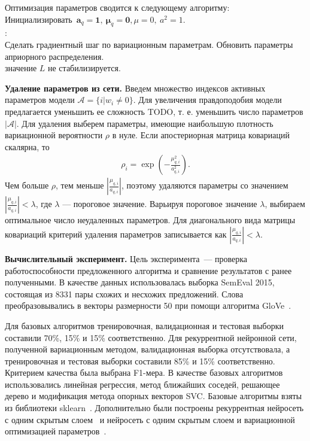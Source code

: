 Оптимизация параметров сводится к следующему алгоритму:\\
\indent \indent Инициализировать~$\mathbf{a}_q = \textbf{1}, \ \boldsymbol{\mu}_q = \textbf{0}, {\mu} = 0, \ a^2 = 1$.\\
\indent {}:\\
\indent \indent Сделать градиентный шаг по вариационным параметрам.
\indent \indent Обновить параметры априорного распределения.\\
\indent {} значение $L$ не стабилизируется.


\textbf{Удаление параметров из сети. }
Введем множество индексов активных параметров модели $\mathcal{A} = \{i | w_i \neq 0\} $. Для увеличения правдоподобия модели предлагается уменьшить ее сложность TODO, т. е. уменьшить число параметров $|\mathcal{A}|$. Для удаления выберем параметры, имеющие наибольшую плотность вариационной вероятности $\rho$ в нуле.
Если апостериорная матрица ковариаций скалярна, то  
\begin{gather}
\rho_i = \exp\left(-\frac{\mu_{q,i}^2}{a_{q,i}^2}\right).
\end{gather}
Чем больше $\rho$, тем меньше $|\frac{\mu_{q,i}}{a_{q,i}}|$, поэтому удаляются параметры со значением $|\frac{\mu_{q,i}}{a_{q,i}}| < \lambda$, где $\lambda$ --- пороговое значение. Варьируя пороговое значение $\lambda$, выбираем оптимальное число неудаленных параметров.
Для диагонального вида матрицы ковариаций критерий удаления параметров записывается как $|\frac{\mu_{q,i}}{a_{q,i}}| < \lambda$.

\textbf{Вычислительный эксперимент. }
Цель эксперимента~--- проверка работоспособности предложенного алгоритма и сравнение результатов с ранее полученными. В качестве данных использовалась выборка SemEval 2015, состоящая из 8331 пары схожих и несхожих предложений. Слова преобразовывались в векторы размерности 50 при помощи алгоритма GloVe~\cite{GloveURL}.

Для базовых алгоритмов тренировочная, валидационная и тестовая выборки составили 70\%, 15\% и 15\% соответственно.
Для рекуррентной нейронной сети, полученной вариационным методом, валидационная выборка отсутствовала, а тренировочная и тестовая выборки составили 85\% и 15\% соответственно.
Критерием качества была выбрана F1-мера.
В качестве базовых алгоритмов использовались линейная регрессия, метод ближайших соседей, решающее дерево и модификация метода опорных векторов SVC. Базовые алгоритмы взяты из библиотеки sklearn~\cite{sklearn}. 
Дополнительно были построены рекуррентная нейросеть с одним скрытым слоем~\cite{sanborn} и нейросеть с одним скрытым слоем и вариационной оптимизацией параметров~\cite{Graves, code}.


